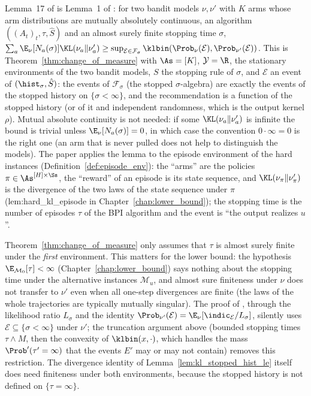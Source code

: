 \begin{remark}\label{rem:pinfo_paper_lemma}
Lemma~17 of \cite{essakine2026tight} is Lemma~1 of \cite{kaufmann2016complexity}: for two
bandit models $\nu, \nu'$ with $K$ arms whose arm distributions are mutually absolutely
continuous, an algorithm $((A_t)_t, \tau, \hat S)$ and an almost surely finite stopping time
$\sigma$, $\sum_a \E_\nu[N_a(\sigma)]\KL(\nu_a\|\nu'_a) \ge \sup_{\mathcal E\in\mathcal F_\sigma}
\klbin(\Prob_\nu(\mathcal E), \Prob_{\nu'}(\mathcal E))$. This is
Theorem~\ref{thm:change_of_measure} with $\As = [K]$, $\mathcal Y = \R$, the stationary
environments of the two bandit models, $S$ the stopping rule of $\sigma$, and $\mathcal E$ an
event of $(\hist_\sigma, \hat S)$: the events of $\mathcal F_\sigma$ (the stopped
$\sigma$-algebra) are exactly the events of the stopped history on $\{\sigma < \infty\}$, and the
recommendation is a function of the stopped history (or of it and independent randomness, which
is the output kernel $\rho$). Mutual absolute continuity is not needed: if some
$\KL(\nu_a\|\nu'_a)$ is infinite the bound is trivial unless $\E_\nu[N_a(\sigma)] = 0$, in which
case the convention $0\cdot\infty = 0$ is the right one (an arm that is never pulled does not
help to distinguish the models). The paper applies the lemma to the episode environment of the
hard instances (Definition~\ref{def:episode_env}): the ``arms'' are the policies
$\pi \in \As^{[H]\times\Ss}$, the ``reward'' of an episode is its state sequence, and
$\KL(\nu_\pi\|\nu'_\pi)$ is the divergence of the two laws of the state sequence under $\pi$
(lem:hard\_kl\_episode in Chapter~\ref{chap:lower_bound}); the stopping time is the number of
episodes $\tau$ of the BPI algorithm and the event is ``the output realizes $u$''.
\end{remark}

\begin{remark}\label{rem:pinfo_one_sided}
Theorem~\ref{thm:change_of_measure} only assumes that $\tau$ is almost surely finite under
the \emph{first} environment. This matters for the lower bound: the hypothesis
$\E_{\mathcal M_0}[\tau] < \infty$ (Chapter~\ref{chap:lower_bound}) says nothing about the
stopping time under the alternative instances $\mathcal M_u$, and almost sure finiteness under
$\nu$ does not transfer to $\nu'$ even when all one-step divergences are finite (the laws of
the whole trajectories are typically mutually singular). The proof of
\cite{kaufmann2016complexity}, through the likelihood ratio $L_\sigma$ and the identity
$\Prob_{\nu'}(\mathcal E) = \E_\nu[\indic_{\mathcal E}/L_\sigma]$, silently uses
$\mathcal E \subseteq \{\sigma < \infty\}$ under $\nu'$; the truncation argument above (bounded
stopping times $\tau\wedge M$, then the convexity of $\klbin(x,\cdot)$, which handles the
mass $\Prob'(\tau' = \infty)$ that the events $E'$ may or may not contain) removes this
restriction. The divergence identity of Lemma~\ref{lem:kl_stopped_hist_le} itself does need
finiteness under both environments, because the stopped history is not defined on
$\{\tau = \infty\}$.
\end{remark}
